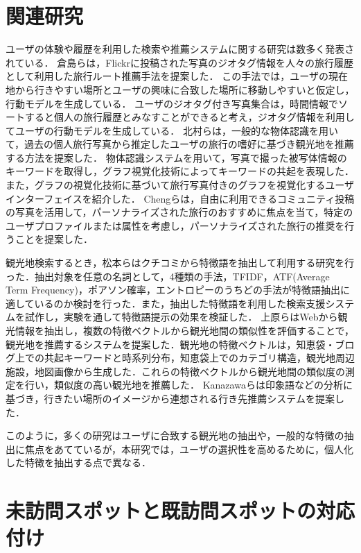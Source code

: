 \documentclass[submit]{ipsj}
\begin{document}
\section{関連研究}
ユーザの体験や履歴を利用した検索や推薦システムに関する研究は数多く発表されている．
倉島ら\cite{Kurashima}は，Flickrに投稿された写真のジオタグ情報を人々の旅行履歴として利用した旅行ルート推薦手法を提案した．
この手法では，ユーザの現在地から行きやすい場所とユーザの興味に合致した場所に移動しやすいと仮定し，行動モデルを生成している．
ユーザのジオタグ付き写真集合は，時間情報でソートすると個人の旅行履歴とみなすことができると考え，ジオタグ情報を利用してユーザの行動モデルを生成している．
北村ら\cite{Kitamura}は，一般的な物体認識を用いて，過去の個人旅行写真から推定したユーザの旅行の嗜好に基づき観光地を推薦する方法を提案した．
物体認識システムを用いて，写真で撮った被写体情報のキーワードを取得し，グラフ視覚化技術によってキーワードの共起を表現した．
また，グラフの視覚化技術に基づいて旅行写真付きのグラフを視覚化するユーザインターフェイスを紹介した．
Chengら\cite{Cheng}は，自由に利用できるコミュニティ投稿の写真を活用して，パーソナライズされた旅行のおすすめに焦点を当て，特定のユーザプロファイルまたは属性を考慮し，パーソナライズされた旅行の推奨を行うことを提案した．

観光地検索するとき，松本ら\cite{松本}はクチコミから特徴語を抽出して利用する研究を行った．抽出対象を任意の名詞として，4種類の手法，TFIDF，ATF(Average Term Frequency)，ポアソン確率，エントロピーのうちどの手法が特徴語抽出に適しているのか検討を行った．また，抽出した特徴語を利用した検索支援システムを試作し，実験を通して特徴語提示の効果を検証した．
上原ら\cite{嶋田}はWebから観光情報を抽出し，複数の特徴ベクトルから観光地間の類似性を評価することで，観光地を推薦するシステムを提案した．観光地の特徴ベクトルは，知恵袋・ブログ上での共起キーワードと時系列分布，知恵袋上でのカテゴリ構造，観光地周辺施設，地図画像から生成した．これらの特徴ベクトルから観光地間の類似度の測定を行い，類似度の高い観光地を推薦した．
Kanazawaら\cite{Kanazawa}は印象語などの分析に基づき，行きたい場所のイメージから連想される行き先推薦システムを提案した．

このように，多くの研究はユーザに合致する観光地の抽出や，一般的な特徴の抽出に焦点をあてているが，本研究では，ユーザの選択性を高めるために，個人化した特徴を抽出する点で異なる．

\section{未訪問スポットと既訪問スポットの対応付け}
\label{sec:未訪問スポットと既訪問スポットの対応付け}
\end{document}
